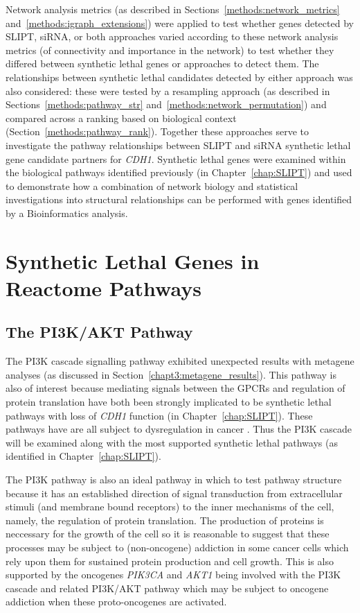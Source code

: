Network analysis metrics (as described in Sections~\ref{methods:network_metrics} and~\ref{methods:igraph_extensions}) were applied to test whether genes detected by SLIPT, siRNA, or both approaches varied according to these network analysis metrics (of connectivity and importance in the network) to test whether they differed between synthetic lethal genes or approaches to detect them. The relationships between synthetic lethal candidates detected by either approach was also considered: these were tested by a resampling approach (as described in Sections~\ref{methods:pathway_str} and~\ref{methods:network_permutation}) and compared across a ranking based on biological context (Section~\ref{methods:pathway_rank}). Together these approaches serve to investigate the pathway relationships between SLIPT and siRNA synthetic lethal gene candidate partners for \textit{CDH1}. Synthetic lethal genes were examined within the biological pathways identified previously (in Chapter~\ref{chap:SLIPT}) and used to demonstrate how a combination of network biology and statistical investigations into structural relationships can be performed with genes identified by a Bioinformatics analysis.

\FloatBarrier

\section{Synthetic Lethal Genes in Reactome Pathways} \label{chapt4:SL_Genes}

\FloatBarrier

\subsection{The PI3K/AKT Pathway}  \label{chapt4:SL_Genes_PI3K}

The \acrfull{PI3K} cascade signalling pathway exhibited unexpected results with metagene analyses (as discussed in Section~\ref{chapt3:metagene_results}). This pathway is also of interest because mediating signals between the \glspl{GPCR} and regulation of protein translation have both been strongly implicated to be synthetic lethal pathways with loss of \textit{CDH1} function (in Chapter~\ref{chap:SLIPT}). These pathways have are all subject to dysregulation in cancer \citep{Dorsam2007, Courtney2010, Gao2015}. Thus the PI3K cascade will be examined along with the most supported synthetic lethal pathways (as identified in Chapter~\ref{chap:SLIPT}).

The \gls{PI3K} pathway is also an ideal pathway in which to test pathway structure because it has an established direction of signal transduction from extracellular stimuli (and membrane bound receptors) to the inner mechanisms of the cell, namely, the regulation of protein translation. The production of proteins is neccessary for the growth of the cell so it is reasonable to suggest that these processes may be subject to (non-oncogene) addiction in some cancer cells which rely upon them for sustained protein production and cell growth. This is also supported by the oncogenes \textit{PIK3CA} and \textit{AKT1} being involved with the PI3K cascade and related PI3K/AKT pathway which may be subject to oncogene addiction when these proto-oncogenes are activated.

